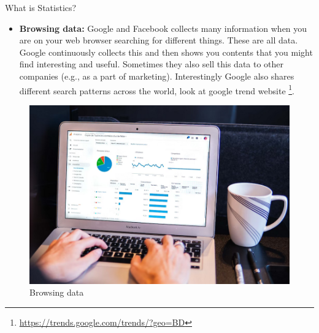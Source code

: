 \documentclass[8pt, usepdftitle=false]{beamer}
\begin{document}
\begin{frame}{What is Statistics?}
\begin{itemize}
\item
  \textbf{Browsing data:} Google and Facebook collects many information
  when you are on your web browser searching for different things. These are all data. Google continuously collects this and then shows you contents that you might find interesting and useful. Sometimes they also sell this data to other companies (e.g., as  a part of marketing). Interestingly Google also shares different search patterns across the world, look at google trend website \footnote[frame]{\url{https://trends.google.com/trends/?geo=BD}}.
\end{itemize}

  \vspace*{.1cm}
  \begin{figure}
\includegraphics[scale = .2]{Images/Browsing_data.png}
\caption{Browsing data}
\end{figure}


\end{frame}
\end{document}
